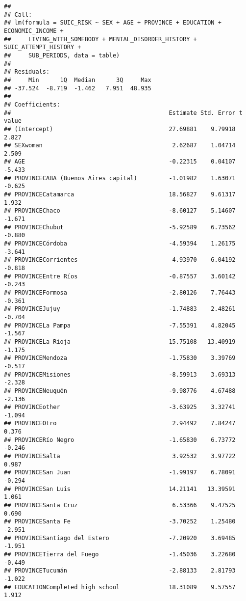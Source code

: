 \documentclass[
]{book}
\begin{document}
\begin{verbatim}
## 
## Call:
## lm(formula = SUIC_RISK ~ SEX + AGE + PROVINCE + EDUCATION + ECONOMIC_INCOME + 
##     LIVING_WITH_SOMEBODY + MENTAL_DISORDER_HISTORY + SUIC_ATTEMPT_HISTORY + 
##     SUB_PERIODS, data = table)
## 
## Residuals:
##     Min      1Q  Median      3Q     Max 
## -37.524  -8.719  -1.462   7.951  48.935 
## 
## Coefficients:
##                                             Estimate Std. Error t value
## (Intercept)                                 27.69881    9.79918   2.827
## SEXwoman                                     2.62687    1.04714   2.509
## AGE                                         -0.22315    0.04107  -5.433
## PROVINCECABA (Buenos Aires capital)         -1.01982    1.63071  -0.625
## PROVINCECatamarca                           18.56827    9.61317   1.932
## PROVINCEChaco                               -8.60127    5.14607  -1.671
## PROVINCEChubut                              -5.92589    6.73562  -0.880
## PROVINCECórdoba                             -4.59394    1.26175  -3.641
## PROVINCECorrientes                          -4.93970    6.04192  -0.818
## PROVINCEEntre Ríos                          -0.87557    3.60142  -0.243
## PROVINCEFormosa                             -2.80126    7.76443  -0.361
## PROVINCEJujuy                               -1.74883    2.48261  -0.704
## PROVINCELa Pampa                            -7.55391    4.82045  -1.567
## PROVINCELa Rioja                           -15.75108   13.40919  -1.175
## PROVINCEMendoza                             -1.75830    3.39769  -0.517
## PROVINCEMisiones                            -8.59913    3.69313  -2.328
## PROVINCENeuquén                             -9.98776    4.67488  -2.136
## PROVINCEother                               -3.63925    3.32741  -1.094
## PROVINCEOtro                                 2.94492    7.84247   0.376
## PROVINCERío Negro                           -1.65830    6.73772  -0.246
## PROVINCESalta                                3.92532    3.97722   0.987
## PROVINCESan Juan                            -1.99197    6.78091  -0.294
## PROVINCESan Luis                            14.21141   13.39591   1.061
## PROVINCESanta Cruz                           6.53366    9.47525   0.690
## PROVINCESanta Fe                            -3.70252    1.25480  -2.951
## PROVINCESantiago del Estero                 -7.20920    3.69485  -1.951
## PROVINCETierra del Fuego                    -1.45036    3.22680  -0.449
## PROVINCETucumán                             -2.88133    2.81793  -1.022
## EDUCATIONCompleted high school              18.31089    9.57557   1.912

\end{verbatim}
\end{document}
